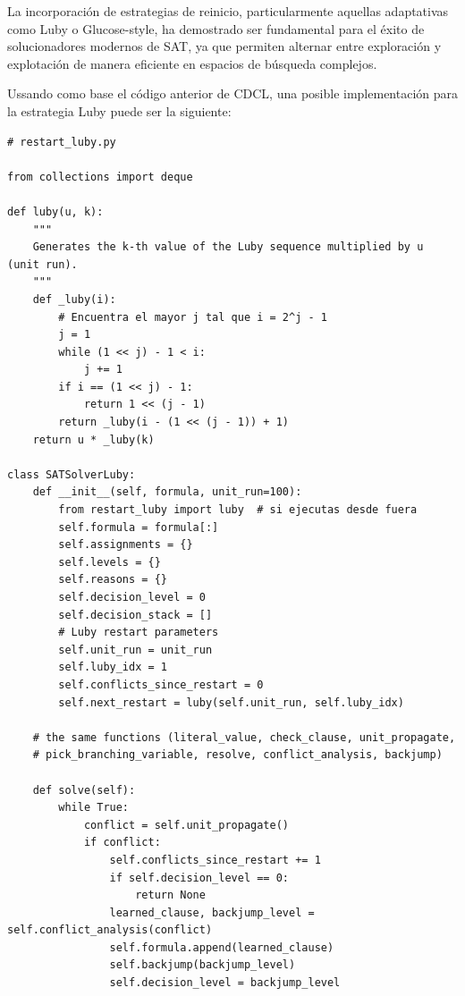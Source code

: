 La incorporación de estrategias de reinicio, particularmente aquellas adaptativas como Luby o Glucose-style, ha demostrado ser fundamental para el éxito de solucionadores modernos de SAT, ya que permiten alternar entre exploración y explotación de manera eficiente en espacios de búsqueda complejos.

Ussando como base el código anterior de CDCL, una posible implementación para la estrategia Luby puede ser la siguiente:

\begin{lstlisting}
# restart_luby.py

from collections import deque

def luby(u, k):
    """
    Generates the k-th value of the Luby sequence multiplied by u (unit run).
    """
    def _luby(i):
        # Encuentra el mayor j tal que i = 2^j - 1
        j = 1
        while (1 << j) - 1 < i:
            j += 1
        if i == (1 << j) - 1:
            return 1 << (j - 1)
        return _luby(i - (1 << (j - 1)) + 1)
    return u * _luby(k)

class SATSolverLuby:
    def __init__(self, formula, unit_run=100):
        from restart_luby import luby  # si ejecutas desde fuera
        self.formula = formula[:]  
        self.assignments = {}
        self.levels = {}
        self.reasons = {}
        self.decision_level = 0
        self.decision_stack = []
        # Luby restart parameters
        self.unit_run = unit_run
        self.luby_idx = 1
        self.conflicts_since_restart = 0
        self.next_restart = luby(self.unit_run, self.luby_idx)

    # the same functions (literal_value, check_clause, unit_propagate,
    # pick_branching_variable, resolve, conflict_analysis, backjump)

    def solve(self):
        while True:
            conflict = self.unit_propagate()
            if conflict:
                self.conflicts_since_restart += 1
                if self.decision_level == 0:
                    return None
                learned_clause, backjump_level = self.conflict_analysis(conflict)
                self.formula.append(learned_clause)
                self.backjump(backjump_level)
                self.decision_level = backjump_level


\end{lstlisting}
